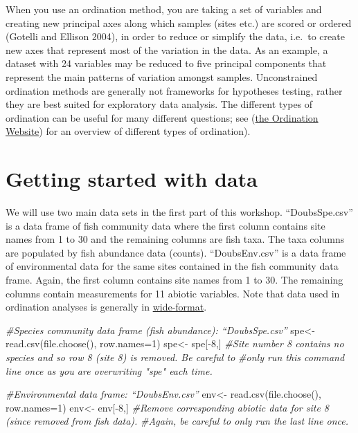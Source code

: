 \documentclass[
]{book}
\newenvironment{Shaded}{\begin{snugshade}}{\end{snugshade}}
\newcommand{\AttributeTok}[1]{\textcolor[rgb]{0.77,0.63,0.00}{#1}}
\newcommand{\CommentTok}[1]{\textcolor[rgb]{0.56,0.35,0.01}{\textit{#1}}}
\newcommand{\DecValTok}[1]{\textcolor[rgb]{0.00,0.00,0.81}{#1}}
\newcommand{\FunctionTok}[1]{\textcolor[rgb]{0.00,0.00,0.00}{#1}}
\newcommand{\NormalTok}[1]{#1}
\newcommand{\OtherTok}[1]{\textcolor[rgb]{0.56,0.35,0.01}{#1}}
\newcommand{\SpecialCharTok}[1]{\textcolor[rgb]{0.00,0.00,0.00}{#1}}
\begin{document}
When you use an ordination method, you are taking a set of variables and
creating new principal axes along which samples (sites etc.) are scored
or ordered (Gotelli and Ellison 2004), in order to reduce or simplify
the data, i.e.~to create new axes that represent most of the variation
in the data. As an example, a dataset with 24 variables may be reduced
to five principal components that represent the main patterns of
variation amongst samples. Unconstrained ordination methods are
generally not frameworks for hypotheses testing, rather they are best
suited for exploratory data analysis. The different types of ordination
can be useful for many different questions; see (\href{http://ordination.okstate.edu/}{the Ordination
Website}) for an overview of different
types of ordination).

\hypertarget{getting-started-with-data}{%
\chapter{Getting started with data}\label{getting-started-with-data}}

We will use two main data sets in the first part of this workshop.
``DoubsSpe.csv'' is a data frame of fish community data where the first
column contains site names from 1 to 30 and the remaining columns are
fish taxa. The taxa columns are populated by fish abundance data
(counts). ``DoubsEnv.csv'' is a data frame of environmental data for the
same sites contained in the fish community data frame. Again, the first
column contains site names from 1 to 30. The remaining columns contain
measurements for 11 abiotic variables. Note that data used in ordination
analyses is generally in
\href{http://en.wikipedia.org/wiki/Wide_and_narrow_data}{wide-format}.

\begin{Shaded}
\begin{Highlighting}[]
\CommentTok{\#Species community data frame (fish abundance): “DoubsSpe.csv”}
\NormalTok{spe}\OtherTok{\textless{}{-}} \FunctionTok{read.csv}\NormalTok{(}\FunctionTok{file.choose}\NormalTok{(), }\AttributeTok{row.names=}\DecValTok{1}\NormalTok{)}
\NormalTok{spe}\OtherTok{\textless{}{-}}\NormalTok{ spe[}\SpecialCharTok{{-}}\DecValTok{8}\NormalTok{,] }\CommentTok{\#Site number 8 contains no species and so row 8 (site 8) is removed. Be careful to}
\CommentTok{\#only run this command line once as you are overwriting "spe" each time. }

\CommentTok{\#Environmental data frame: “DoubsEnv.csv”}
\NormalTok{env}\OtherTok{\textless{}{-}} \FunctionTok{read.csv}\NormalTok{(}\FunctionTok{file.choose}\NormalTok{(), }\AttributeTok{row.names=}\DecValTok{1}\NormalTok{)}
\NormalTok{env}\OtherTok{\textless{}{-}}\NormalTok{ env[}\SpecialCharTok{{-}}\DecValTok{8}\NormalTok{,] }\CommentTok{\#Remove corresponding abiotic data for site 8 (since removed from fish data). }
\CommentTok{\#Again, be careful to only run the last line once. }
\end{Highlighting}
\end{Shaded}
\end{document}
